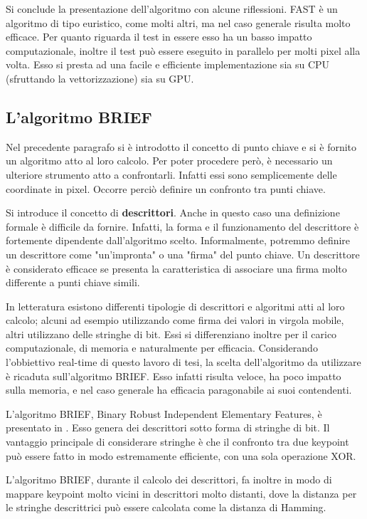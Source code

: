 Si conclude la presentazione dell'algoritmo con alcune riflessioni. FAST è un algoritmo di tipo euristico, come molti altri, ma nel caso generale risulta molto efficace. Per quanto riguarda il test in essere esso ha un basso impatto computazionale, inoltre il test può essere eseguito in parallelo per molti pixel alla volta. Esso si presta ad una facile e efficiente implementazione sia su CPU (sfruttando la vettorizzazione) sia su GPU.

\subsection{L'algoritmo BRIEF}
\label{sec:det:brief}
Nel precedente paragrafo si è introdotto il concetto di punto chiave e si è fornito un algoritmo atto al loro calcolo. Per poter procedere però, è necessario un ulteriore strumento atto a confrontarli. Infatti essi sono semplicemente delle coordinate in pixel. Occorre perciò definire un confronto tra punti chiave.

Si introduce il concetto di \textbf{descrittori}. Anche in questo caso una definizione formale è difficile da fornire. Infatti, la forma e il funzionamento del descrittore è fortemente dipendente dall'algoritmo scelto. Informalmente, potremmo definire un descrittore come "un'impronta" o una "firma" del punto chiave. Un descrittore è considerato efficace se presenta la caratteristica di associare una firma molto differente a punti chiave simili.

In letteratura esistono differenti tipologie di descrittori e algoritmi atti al loro calcolo; alcuni ad esempio utilizzando come firma dei valori in virgola mobile, altri utilizzano delle stringhe di bit. Essi si differenziano inoltre per il carico computazionale, di memoria e naturalmente per efficacia.
Considerando l'obbiettivo real-time di questo lavoro di tesi, la scelta dell'algoritmo da utilizzare è ricaduta sull'algoritmo BRIEF. Esso infatti risulta veloce, ha poco impatto sulla memoria, e nel caso generale ha efficacia paragonabile ai suoi contendenti.

L'algoritmo BRIEF, Binary Robust Independent Elementary Features, è presentato in \cite{bib4}. Esso genera dei descrittori sotto forma di stringhe di bit. Il vantaggio principale di considerare stringhe è che il confronto tra due keypoint può essere fatto in modo estremamente efficiente, con una sola operazione XOR.

L'algoritmo BRIEF, durante il calcolo dei descrittori, fa inoltre in modo di mappare keypoint molto vicini in descrittori molto distanti, dove la distanza per le stringhe descrittrici può essere calcolata come la distanza di Hamming.

